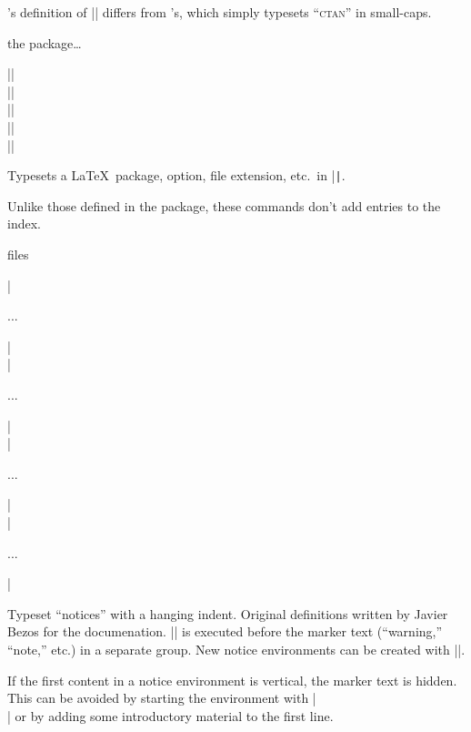 \documentclass{ltxguidex}
\newcommand{\ltx}{\ltxclass{ltxguidex}}
\begin{document}
\begin{warning}
	\ltx's definition of |\ctan| differs from 's,
	which simply typesets ``\textsc{ctan}'' in small-caps.
\end{warning}

\begin{LTXexample}
the  package\dots
\end{LTXexample}

\begin{desc}
||\\
||\\
||\\
||\\
||
\end{desc}

Typesets a \LaTeX\ package, option, file extension, etc.\ in |\texttt|.

\begin{note}
	Unlike those defined in the  package, these commands
	don't add entries to the index.
\end{note}

\begin{LTXexample}
 files
\end{LTXexample}

\begin{desc}
|\begin{warning}...\end{warning}|\\
|\begin{note}...\end{note}|\\
|\begin{example}...\end{example}|\\
|\begin{bug}...\end{bug}|
\end{desc}

Typeset ``notices'' with a hanging indent. Original definitions written by
Javier Bezos for the  documenation. |\ltxguidex@noticestyle|
is executed before the marker text (``warning,'' ``note,'' etc.) in a
separate group. New notice environments can be created with |\newnotice|.

\begin{bug}
	If the first content in a notice environment is vertical, the marker
	text is hidden. This can be avoided by starting the
	environment with |\leavevmode\\| or by adding some introductory
	material to the first line.
\end{bug}
\end{document}
